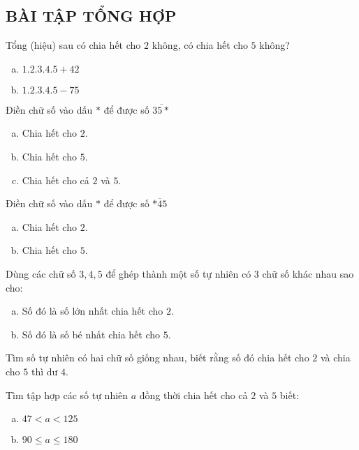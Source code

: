 \subsection{BÀI TẬP TỔNG HỢP}
\begin{bt} Tổng (hiệu) sau có chia hết cho $2$ không, có chia hết cho $5$ không?
\begin{enumerate}[a)]
\item $1 . 2 . 3 . 4 . 5 + 42$
\item $1 . 2 . 3 . 4 . 5 - 75$
\end{enumerate}
\end{bt}   \begin{bt} Điền chữ số vào dấu ${*}$ để được số $\overline {35*}$
\begin{enumerate}[a)]
\item Chia hết cho $2$. 
\item Chia hết cho $5$. 
\item Chia hết cho cả $2$ và $5$. 
\end{enumerate}
\end{bt}   \begin{bt} Điền chữ số vào dấu ${*}$ để được số $\overline {*45}$
\begin{enumerate}[a)]
\item Chia hết cho $2$. 
\item Chia hết cho $5$. 
\end{enumerate}
\end{bt}   \begin{bt}
Dùng các chữ số $3, 4, 5$ để ghép thành một số tự nhiên có $3$ chữ số khác nhau sao cho:
\begin{enumerate}[a)]
\item Số đó là số lớn nhất chia hết cho $2$.
\item Số đó là số bé nhất chia hết cho $5$.
\end{enumerate}   
\end{bt}   \begin{bt}
Tìm số tự nhiên có hai chữ số giống nhau, biết rằng số đó chia hết cho $2$ và chia cho $5$ thì dư $4$.
\end{bt}   \begin{bt}
Tìm tập hợp các số tự nhiên $a$  đồng thời chia hết cho cả $2$ và $5$ biết:
\begin{enumerate}[a)]
\item $47 < a < 125$
\item $90 \le a \le 180$
\end{enumerate}  
\end{bt}   \begin{bt}

\end{bt}
